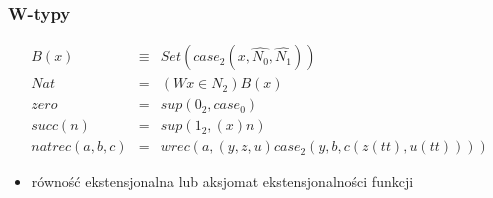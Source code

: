 \documentclass{beamer}
\begin{document}

\begin{frame}
\frametitle{W-typy}

\begin{eqnarray*}
B(x) &\equiv& Set(case_2(x, \hat{N_0}, \hat{N_1})) \\
Nat           &=& (Wx \in N_2) B(x) \\
zero          &=& sup(0_2, case_0) \\
succ(n)       &=& sup(1_2, (x) n) \\
natrec(a,b,c) &=& wrec(a, (y,z,u)case_2(y, b, c(z(tt), u(tt))))
\end{eqnarray*}

\begin{itemize}
 \item równość ekstensjonalna lub aksjomat ekstensjonalności funkcji
\end{itemize}


\end{frame}

\end{document}
